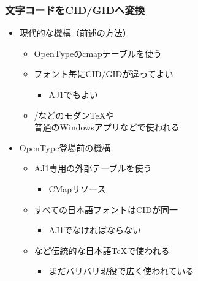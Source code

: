 \begin{frame}\frametitle{文字コードをCID/GIDへ変換}
  \begin{itemize}
  \item 現代的な機構（前述の方法）
    \begin{itemize}
    \item OpenTypeのcmapテーブルを使う
    \item フォント毎にCID/GIDが違ってよい
      \begin{itemize}
      \item AJ1でもよい
      \end{itemize}
    \item \LuaTeX /\XeTeX などのモダン\TeX や \\
      普通のWindowsアプリなどで使われる
    \end{itemize}
  \item OpenType登場前の機構
    \begin{itemize}
    \item AJ1専用の外部テーブルを使う
      \begin{itemize}
      \item CMapリソース
      \end{itemize}
    \item すべての日本語フォントはCIDが同一
      \begin{itemize}
      \item AJ1でなければならない
      \end{itemize}
    \item \pTeX など伝統的な日本語\TeX で使われる
      \begin{itemize}
      \item まだバリバリ現役で広く使われている
      \end{itemize}
    \end{itemize}
  \end{itemize}
\end{frame}

